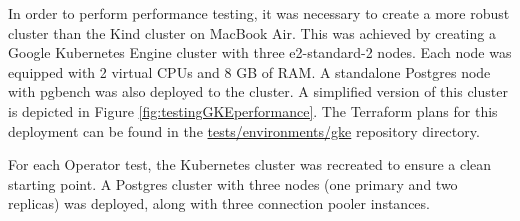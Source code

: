 


In order to perform performance testing, it was necessary to create a more robust cluster than the Kind cluster on MacBook Air. This was achieved by creating a Google Kubernetes Engine cluster with three e2-standard-2 nodes. Each node was equipped with 2 virtual CPUs and 8 GB of RAM. A standalone Postgres node with pgbench was also deployed to the cluster. A simplified version of this cluster is depicted in Figure \ref{fig:testingGKEperformance}. The Terraform plans for this deployment can be found in the \url{tests/environments/gke} repository directory.

For each Operator test, the Kubernetes cluster was recreated to ensure a clean starting point. A Postgres cluster with three nodes (one primary and two replicas) was deployed, along with three connection pooler instances.

